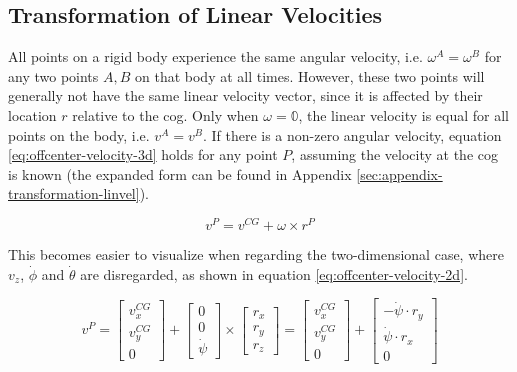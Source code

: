 \subsection{Transformation of Linear Velocities}
All points on a rigid body experience the same angular velocity, i.e. $\omega^A = \omega^B$ for any two points $A, B$ on that body at all times. However, these two points will generally not have the same linear velocity vector, since it is affected by their location $r$ relative to the \gls{cog}. Only when $\omega = \mathbb{0}$, the linear velocity is equal for all points on the body, i.e. $v^A = v^B$. If there is a non-zero angular velocity, equation \ref{eq:offcenter-velocity-3d} holds for any point $P$, assuming the velocity at the \gls{cog} is known (the expanded form can be found in Appendix \ref{sec:appendix-transformation-linvel}).

\begin{equation}\label{eq:offcenter-velocity-3d}%
v^P = v^{CG} + \omega \times r^P%
\end{equation}

This becomes easier to visualize when regarding the two-dimensional case, where $v_z$, $\dot{\phi}$ and $\dot{\theta}$ are disregarded, as shown in equation \ref{eq:offcenter-velocity-2d}.

\begin{equation}\label{eq:offcenter-velocity-2d}%
v^P%
= \begin{bmatrix}v_x^{CG} \\ v_y^{CG} \\ 0\end{bmatrix} + \begin{bmatrix}0 \\ 0 \\ \dot{\psi}\end{bmatrix} \times \begin{bmatrix}r_x \\ r_y \\ r_z\end{bmatrix}%
= \begin{bmatrix}v_x^{CG} \\ v_y^{CG} \\ 0\end{bmatrix} + \begin{bmatrix}-\dot{\psi} \cdot r_y \\ \dot{\psi} \cdot r_x \\ 0\end{bmatrix}%
 \end{equation}

